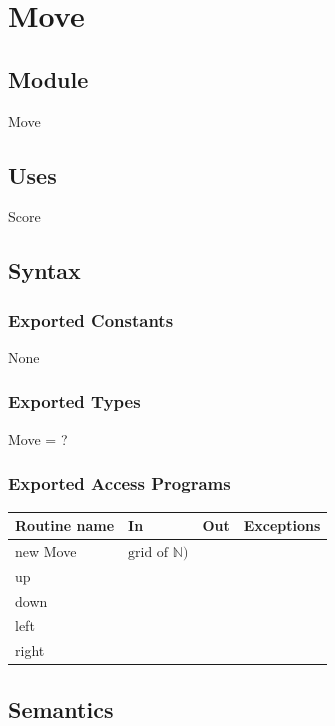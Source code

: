 \documentclass[12pt]{article}
\begin{document}
\newpage

\section* {Move}

\subsection*{Module}

Move

\subsection* {Uses}

Score

\subsection* {Syntax}

\subsubsection* {Exported Constants}

None

\subsubsection* {Exported Types}

Move = ?

\subsubsection* {Exported Access Programs}

\begin{tabular}{| l | l | l | p{5cm} |}
  \hline
  \textbf{Routine name} & \textbf{In} & \textbf{Out} & \textbf{Exceptions}\\
  \hline
  new Move & $\text{grid of } \mathbb{N})$ & & \\
  \hline
  up & & & \\
  \hline
  down & & & \\
  \hline
  left & & & \\
  \hline
  right & & & \\
  \hline
  
\end{tabular}

\subsection* {Semantics}
\end{document}
